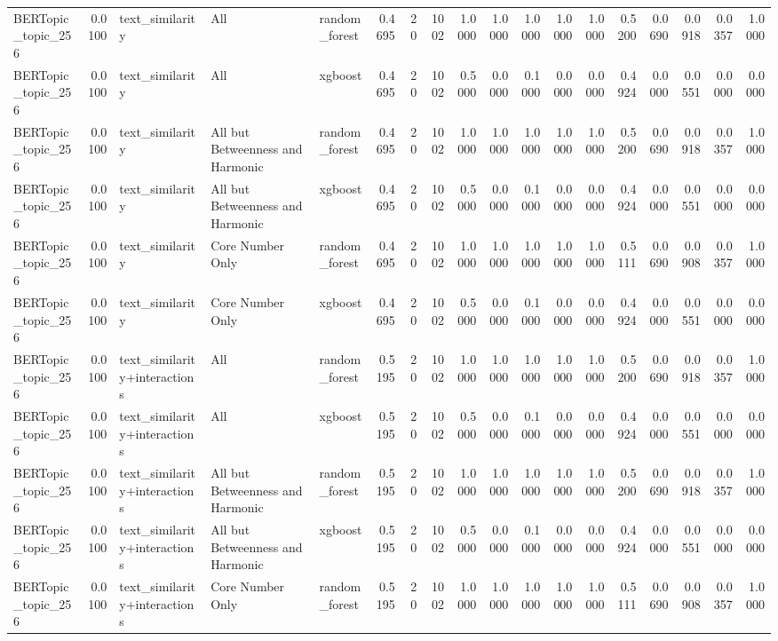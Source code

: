 \begin{tabular}{lrlllrrrrrrrrrrrrr}
BERTopic_topic_256 & 0.0100 & text_similarity & All & random_forest & 0.4695 & 20 & 1002 & 1.0000 & 1.0000 & 1.0000 & 1.0000 & 1.0000 & 0.5200 & 0.0690 & 0.0918 & 0.0357 & 1.0000 \\
BERTopic_topic_256 & 0.0100 & text_similarity & All & xgboost & 0.4695 & 20 & 1002 & 0.5000 & 0.0000 & 0.1000 & 0.0000 & 0.0000 & 0.4924 & 0.0000 & 0.0551 & 0.0000 & 0.0000 \\
BERTopic_topic_256 & 0.0100 & text_similarity & All but Betweenness and Harmonic & random_forest & 0.4695 & 20 & 1002 & 1.0000 & 1.0000 & 1.0000 & 1.0000 & 1.0000 & 0.5200 & 0.0690 & 0.0918 & 0.0357 & 1.0000 \\
BERTopic_topic_256 & 0.0100 & text_similarity & All but Betweenness and Harmonic & xgboost & 0.4695 & 20 & 1002 & 0.5000 & 0.0000 & 0.1000 & 0.0000 & 0.0000 & 0.4924 & 0.0000 & 0.0551 & 0.0000 & 0.0000 \\
BERTopic_topic_256 & 0.0100 & text_similarity & Core Number Only & random_forest & 0.4695 & 20 & 1002 & 1.0000 & 1.0000 & 1.0000 & 1.0000 & 1.0000 & 0.5111 & 0.0690 & 0.0908 & 0.0357 & 1.0000 \\
BERTopic_topic_256 & 0.0100 & text_similarity & Core Number Only & xgboost & 0.4695 & 20 & 1002 & 0.5000 & 0.0000 & 0.1000 & 0.0000 & 0.0000 & 0.4924 & 0.0000 & 0.0551 & 0.0000 & 0.0000 \\
BERTopic_topic_256 & 0.0100 & text_similarity+interactions & All & random_forest & 0.5195 & 20 & 1002 & 1.0000 & 1.0000 & 1.0000 & 1.0000 & 1.0000 & 0.5200 & 0.0690 & 0.0918 & 0.0357 & 1.0000 \\
BERTopic_topic_256 & 0.0100 & text_similarity+interactions & All & xgboost & 0.5195 & 20 & 1002 & 0.5000 & 0.0000 & 0.1000 & 0.0000 & 0.0000 & 0.4924 & 0.0000 & 0.0551 & 0.0000 & 0.0000 \\
BERTopic_topic_256 & 0.0100 & text_similarity+interactions & All but Betweenness and Harmonic & random_forest & 0.5195 & 20 & 1002 & 1.0000 & 1.0000 & 1.0000 & 1.0000 & 1.0000 & 0.5200 & 0.0690 & 0.0918 & 0.0357 & 1.0000 \\
BERTopic_topic_256 & 0.0100 & text_similarity+interactions & All but Betweenness and Harmonic & xgboost & 0.5195 & 20 & 1002 & 0.5000 & 0.0000 & 0.1000 & 0.0000 & 0.0000 & 0.4924 & 0.0000 & 0.0551 & 0.0000 & 0.0000 \\
BERTopic_topic_256 & 0.0100 & text_similarity+interactions & Core Number Only & random_forest & 0.5195 & 20 & 1002 & 1.0000 & 1.0000 & 1.0000 & 1.0000 & 1.0000 & 0.5111 & 0.0690 & 0.0908 & 0.0357 & 1.0000 \\

\end{tabular}
